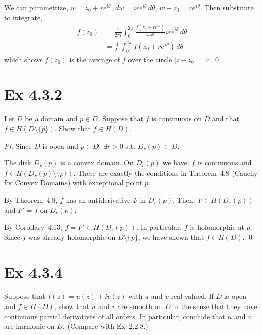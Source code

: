 \documentclass[a4paper]{article}
\begin{document}
We can parametrize, $w=z_0+re^{i\theta}$, $dw=ire^{i\theta}\,d\theta$, $w-z_0=re^{i\theta}$.  Then substitute to integrate,
\begin{align*}
  f(z_0)
  &= \frac{1}{2\pi i}\int_0^{2\pi}
    \frac{f(z_0+re^{i\theta})}{re^{i\theta}} ire^{i\theta}\,d\theta\\
  &= \frac{1}{2\pi}\int_0^{2\pi} f(z_0+re^{i\theta})\,d\theta
\end{align*}
which shows $f(z_0)$ is the average of $f$ over the circle $|z-z_0|=r$. \qed

\newpage
\section*{Ex 4.3.2}

\begin{tcolorbox}[colback=gray!10, colframe=black, boxrule=0.5pt, arc=2mm]
Let $D$ be a domain and $p\in D$.  Suppose that $f$ is continuous on $D$ and
that $f\in H(D\setminus\{p\})$.  Show that $f\in H(D)$.
\end{tcolorbox}

\textit{Pf.} Since $D$ is open and $p\in D$, $\exists r>0$ s.t. $D_r(p)\subset D$.

\medskip
The disk $D_r(p)$ is a convex domain.
On $D_r(p)$ we have: $f$ is continuous and $f\in H(D_r(p)\setminus\{p\})$.
These are exactly the conditions in Theorem~4.8 (Cauchy for Convex Domains) with exceptional point $p$.

\medskip
By Theorem~4.8, $f$ has an antiderivative $F$ in $D_r(p)$. Then, $F\in H(D_r(p))$ and $F'=f$ on $D_r(p)$.

By Corollary~4.13, $f=F'\in H(D_r(p))$.
In particular, $f$ is holomorphic at $p$.
Since $f$ was already holomorphic on $D\setminus\{p\}$, we have shown that $f\in H(D)$. \qed

\newpage
\section*{Ex 4.3.4}

\begin{tcolorbox}[colback=gray!10, colframe=black, boxrule=0.5pt, arc=2mm]
Suppose that $f(z)=u(z)+iv(z)$ with $u$ and $v$ real-valued.  If $D$ is open
and $f\in H(D)$, show that $u$ and $v$ are smooth on $D$ in the sense that they
have continuous partial derivatives of all orders.  In particular, conclude that
$u$ and $v$ are harmonic on $D$.  (Compare with Ex~2.2.8.)
\end{tcolorbox}
\end{document}

